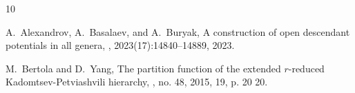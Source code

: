 \documentclass[11pt]{amsart}
\theoremstyle{definition}
\theoremstyle{remark}
\newcommand{\<}{\left<}
\renewcommand{\>}{\right>}
\numberwithin{equation}{section}
\begin{document}
\begin{thebibliography}{10}

A.~Alexandrov, A.~Basalaev, and %
A.~Buryak,
\newblock A construction of open descendant potentials in all genera,
,
  2023(17):14840--14889, 2023. %

M.~Bertola and %
D.~Yang,
\newblock The partition function of the extended {$r$}-reduced
  {K}adomtsev-{P}etviashvili hierarchy,
, no. 48, 2015, 19, p. 20 20.


\end{thebibliography}
\end{document}
